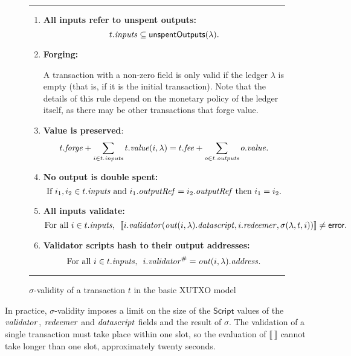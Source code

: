 \documentclass[a4paper]{article}
\theoremstyle{definition}  %
\newenvironment{ruledfigure}[1]{\begin{figure}[#1]\hrule\vspace{10pt}}{\vspace{10pt}\hrule\end{figure}}
\begin{document}
\begin{ruledfigure}{H}
\begin{enumerate}
    \item \label{all-inputs-refer-to-unspent-outputs} \textbf{All
      inputs refer to unspent outputs:}
      \[
        t.\mathit{inputs} \subseteq \mathsf{unspentOutputs}(\lambda).
      \]
    \item\label{forging} \textbf{Forging:}
      \begin{center}
        \parbox{0.8\textwidth}{
        A transaction with a non-zero \forge{} field is only
        valid if the ledger $\lambda$ is empty
        (that is, if it is the initial
        transaction). Note that the details of this rule depend on the
        monetary policy of the ledger itself, as there may be other
        transactions that forge value.
        }
    \end{center}
      
    \item \label{value-is-preserved} \textbf{Value is preserved}:
    \[
      t.\mathit{forge} + \sum_{i \in t.\mathit{inputs}} t.\mathit{value}(i, \lambda) = t.\mathit{fee} + \sum_{o \in t.\mathit{outputs}} o.\mathit{value}.
    \]
    \item \label{no-double-spending} \textbf{No output is double spent:}
    \[
     \textrm{If } i_1, i_2 \in t.\mathit{inputs} \textrm{ and }  i_1.\mathit{outputRef} = i_2.\mathit{outputRef}
     \textrm{ then } i_1 = i_2.
    \]
    \item\label{all-inputs-validate} \textbf{All inputs validate:}
    \[
    \textrm{For all } i \in t.\mathit{inputs},\enspace \llbracket
    i.\mathit{validator}(\mathit{out}(i, \lambda).\mathit{datascript},i.\mathit{redeemer}, \sigma(\lambda, t, i)) \rrbracket \ne \textsf{error}.
      \]
    \item\label{validator-scripts-hash} \textbf{Validator scripts hash to their output addresses:}
    \[
      \textrm{For all } i \in t.\mathit{inputs},\enspace i.\mathit{validator}^{\#} = \mathit{out}(i, \lambda).\mathit{address}.
    \]
\end{enumerate}
\caption{$\sigma$-validity of a transaction $t$ in the basic XUTXO model}
\label{fig:basic-xutxo-validity}
\end{ruledfigure}



\noindent In practice, $\sigma$-validity imposes a limit on the size of the
$\mathsf{Script}$ values of the $\mathit{validator}$, $\mathit{redeemer}$ and
$\mathit{datascript}$ fields and the result of $\sigma$. The validation of a
single transaction must take place within one slot, so the evaluation
of $\llbracket ~ \rrbracket$ cannot take longer than one slot,
approximately twenty seconds.
\end{document}
